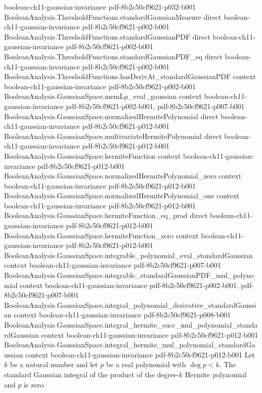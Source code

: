 \begin{lemma}
  {boolean-ch11-gaussian-invariance}
  {pdf-8b2c50cf9621-p032-b001}
\proofstep
  {BooleanAnalysis.ThresholdFunctions.standardGaussianMeasure}
  {direct}
  {boolean-ch11-gaussian-invariance}
  {pdf-8b2c50cf9621-p002-b001}
\proofstep
  {BooleanAnalysis.ThresholdFunctions.standardGaussianPDF}
  {direct}
  {boolean-ch11-gaussian-invariance}
  {pdf-8b2c50cf9621-p002-b001}
\proofstep
  {BooleanAnalysis.ThresholdFunctions.standardGaussianPDF_eq}
  {direct}
  {boolean-ch11-gaussian-invariance}
  {pdf-8b2c50cf9621-p002-b001}
\proofstep
  {BooleanAnalysis.ThresholdFunctions.hasDerivAt_standardGaussianPDF}
  {context}
  {boolean-ch11-gaussian-invariance}
  {pdf-8b2c50cf9621-p002-b001}
\proofstep
  {BooleanAnalysis.GaussianSpace.memLp_eval_gaussian}
  {context}
  {boolean-ch11-gaussian-invariance}
  {pdf-8b2c50cf9621-p002-b001,
    pdf-8b2c50cf9621-p007-b001}
\proofstep
  {BooleanAnalysis.GaussianSpace.normalizedHermitePolynomial}
  {direct}
  {boolean-ch11-gaussian-invariance}
  {pdf-8b2c50cf9621-p012-b001}
\proofstep
  {BooleanAnalysis.GaussianSpace.multivariateHermitePolynomial}
  {direct}
  {boolean-ch11-gaussian-invariance}
  {pdf-8b2c50cf9621-p012-b001}
\proofstep
  {BooleanAnalysis.GaussianSpace.hermiteFunction}
  {context}
  {boolean-ch11-gaussian-invariance}
  {pdf-8b2c50cf9621-p012-b001}
\proofstep
  {BooleanAnalysis.GaussianSpace.normalizedHermitePolynomial_zero}
  {context}
  {boolean-ch11-gaussian-invariance}
  {pdf-8b2c50cf9621-p012-b001}
\proofstep
  {BooleanAnalysis.GaussianSpace.normalizedHermitePolynomial_one}
  {context}
  {boolean-ch11-gaussian-invariance}
  {pdf-8b2c50cf9621-p012-b001}
\proofstep
  {BooleanAnalysis.GaussianSpace.hermiteFunction_eq_prod}
  {direct}
  {boolean-ch11-gaussian-invariance}
  {pdf-8b2c50cf9621-p012-b001}
\proofstep
  {BooleanAnalysis.GaussianSpace.hermiteFunction_zero}
  {context}
  {boolean-ch11-gaussian-invariance}
  {pdf-8b2c50cf9621-p012-b001}
\proofstep
  {BooleanAnalysis.GaussianSpace.integrable_polynomial_eval_standardGaussian}
  {context}
  {boolean-ch11-gaussian-invariance}
  {pdf-8b2c50cf9621-p007-b001}
\proofstep
  {BooleanAnalysis.GaussianSpace.integrable_standardGaussianPDF_mul_polynomial}
  {context}
  {boolean-ch11-gaussian-invariance}
  {pdf-8b2c50cf9621-p002-b001,
    pdf-8b2c50cf9621-p007-b001}
\proofstep
  {BooleanAnalysis.GaussianSpace.integral_polynomial_derivative_standardGaussian}
  {context}
  {boolean-ch11-gaussian-invariance}
  {pdf-8b2c50cf9621-p008-b001}
\proofstep
  {BooleanAnalysis.GaussianSpace.integral_hermite_succ_mul_polynomial_standardGaussian}
  {context}
  {boolean-ch11-gaussian-invariance}
  {pdf-8b2c50cf9621-p012-b001}
\proofstep
  {BooleanAnalysis.GaussianSpace.integral_hermite_mul_polynomial_standardGaussian}
  {context}
  {boolean-ch11-gaussian-invariance}
  {pdf-8b2c50cf9621-p012-b001}
Let $k$ be a natural number and let $p$ be a real polynomial with $\deg p<k$. The
standard Gaussian integral of the product of the degree-$k$ Hermite polynomial and $p$
is zero.
\end{lemma}

